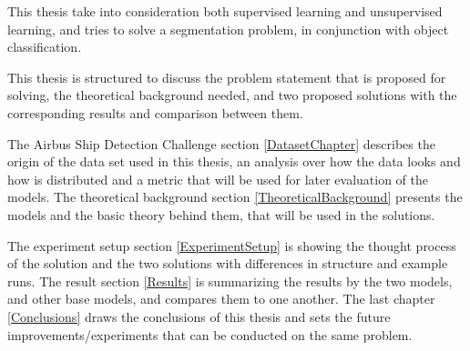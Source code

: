 This thesis take into consideration both supervised learning and unsupervised learning, and tries to solve a segmentation problem, in conjunction with object classification.

This thesis is structured to discuss the problem statement that is proposed for solving, the theoretical background needed, and two proposed solutions with the corresponding results and comparison between them.

The Airbus Ship Detection Challenge section \ref{DatasetChapter} describes the origin of the data set used in this thesis, an analysis over how the data looks and how is distributed and a metric that will be used for later evaluation of the models. The theoretical background section \ref{TheoreticalBackground} presents the models and the basic theory behind them, that will be used in the solutions.

The experiment setup section \ref{ExperimentSetup} is showing the thought process of the solution and the two solutions with differences in structure and example runs. The result section \ref{Results} is summarizing the results by the two models, and other base models, and compares them to one another. The last chapter \ref{Conclusions} draws the conclusions of this thesis and sets the future improvements/experiments that can be conducted on the same problem.
